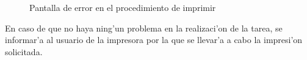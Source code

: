 \begin{enumerate}
\begin{itemize}
\begin{figure}[h!]
	\begin{center}
     	\end{center}
    	\caption{Pantalla de error en el procedimiento de imprimir}\label{fig:error_imprimir}
\end{figure}

En caso de que no haya ning'un problema en la realizaci'on  de la tarea, se informar'a al usuario de la impresora por la que se llevar'a a cabo la impresi'on solicitada.


\end{itemize}
\end{enumerate}
